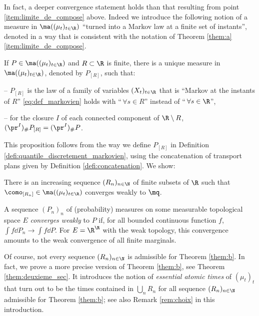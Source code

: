 In fact, a deeper convergence statement holds than that resulting from point \eqref{item:limite_de_compose} above. Indeed we introduce the following notion of a measure in $\ma((\mu_t)_{t\in\R})$ ``turned into a Markov law at a finite set of instants'', denoted in a way that is consistent with the notation of Theorem \ref{them:a}\eqref{item:limite_de_compose}.

\begin{pronotation}\label{pro:markovinise_fini1} If $P\in\ma((\mu_t)_{t\in\R})$ and $R\subset \R$ is finite, there is a unique measure in $\ma((\mu_t)_{t\in\R})$, denoted by $P_{[R]}$, such that:

-- $P_{[R]}$ is the law of a family of variables $(X_t)_{t\in\R}$ that is ``Markov at the instants of\/ $R$'' \ie \eqref{eq:def_markovien} holds with ``$\,\forall s\in R$'' instead of ``$\,\forall s\in\R$'',

-- for the closure $I$ of each connected component of $\R\setminus R$, $(\pr^I)_\# P_{[R]}=(\pr^I)_\# P$.
\end{pronotation}

This proposition follows from the way we define $P_{[R]}$ in Definition \ref{defi:quantile_discretement_markovien}, using the concatenation of transport plans given by Definition \ref{defi:concatenation}. We show:

\begin{themBJ}\label{them:b}There is an increasing sequence $(R_n)_{n\in\N}$ of finite subsets of $\R$ such that $\como_{[R_n]}\in\ma((\mu_t)_{t\in\R})$ converges weakly to $\mq$.
\end{themBJ}

\begin{reminder}\label{reminder:weak_convergence} A sequence $(P_n)_n$ of (probability) measures on some measurable topological space $E$ \emph{converges weakly} to $P$ if, for all bounded continuous function $f$, $\int f\dd P_n\to\int f\dd P$. For $E=\R^\R$ with the weak topology, this convergence amounts to the weak convergence of all finite marginals.
\end{reminder}

\begin{rem} Of course, not every sequence $(R_n)_{n\in \N}$ is admissible for Theorem \ref{them:b}. In fact, we prove a more precise version of Theorem \ref{them:b}, see Theorem \ref{them:deuxieme_sec}. It introduces the notion of \emph{essential atomic times} of $(\mu_t)_t$ that turn out to be the times contained in $\bigcup_n R_n$ for all sequence $(R_n)_{n\in \N}$ admissible for Theorem \ref{them:b}; see also Remark \ref{rem:choix} in this introduction.
\end{rem}


